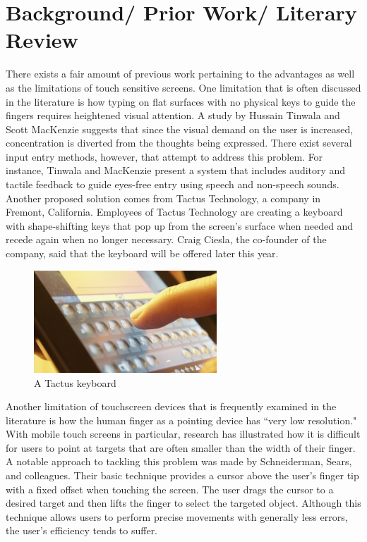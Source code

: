 \documentclass{article}
\begin{document}
\section{Background/ Prior Work/ Literary Review}
There exists a fair amount of previous work pertaining to the advantages as well as the limitations of touch sensitive screens. One limitation that is often discussed in the literature is how typing on flat surfaces with no physical keys to guide the fingers requires heightened visual attention. A study by Hussain Tinwala and Scott MacKenzie suggests that since the visual demand on the user is increased, concentration is diverted from the thoughts being expressed. \cite{Tinwala:2010:ETE:1868914.1868972} There exist several input entry methods, however, that attempt to address this problem. For instance, Tinwala and MacKenzie present a system that includes auditory and tactile feedback to guide eyes-free entry using speech and non-speech sounds. \cite{Tinwala:2010:ETE:1868914.1868972} Another proposed solution comes from Tactus Technology, a company in Fremont, California. Employees of Tactus Technology are creating a keyboard with shape-shifting keys that pop up from the screen's surface when needed and recede again when no longer necessary.\cite{Tactus} Craig Ciesla, the co-founder of the company, said that the keyboard will be offered later this year. 

\begin{figure}[ht]
\centering
\includegraphics[width=2.7in]{tactus-keyboard.jpg} 
\caption{A Tactus keyboard}
\label{figure-sample}
\end{figure}

Another limitation of touchscreen devices that is frequently examined in the literature is how the human finger as a pointing device has ``very low resolution."\cite{Albinsson} With mobile touch screens in particular, research has illustrated how it is difficult for users to point at targets that are often smaller than the width of their finger. A notable approach to tackling this problem was made by Schneiderman, Sears, and colleagues.\cite{Sears} Their basic technique provides a cursor above the user's finger tip with a fixed offset when touching the screen. The user drags the cursor to a desired target and then lifts the finger to select the targeted object. Although this technique allows users to perform precise movements with generally less errors, the user's efficiency tends to suffer.
\end{document}
